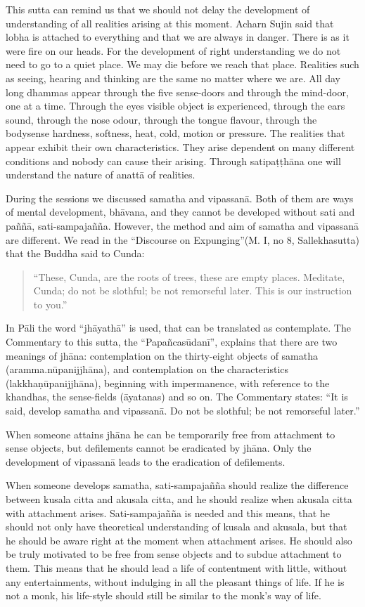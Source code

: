 This sutta can remind us that we should not delay the development of understanding of all realities arising at this moment. Acharn Sujin said that lobha is attached to everything and that we are always in danger. There is as it were fire on our heads.
For the development of right understanding we do not need to go to a quiet place. We may die before we reach that place. Realities such as seeing, hearing and thinking are the same no matter where we are. All day long dhammas appear through the five sense-doors and through the mind-door, one at a time. Through the eyes visible object is experienced, through the ears sound, through the nose odour, through the tongue flavour, through the bodysense hardness, softness, heat, cold, motion or pressure. The realities that appear exhibit their own characteristics. They arise dependent on many different conditions and nobody can cause their arising. Through satipaṭṭhāna one will understand the nature of anattā of realities.

During the sessions we discussed samatha and vipassanā. Both of them are ways of mental development, bhāvana, and they cannot be developed without sati and paññā, sati-sampajañña. However, the method and aim of samatha and vipassanā are different.
We read in the ``Discourse on Expunging''(M. I, no 8, Sallekhasutta) that the Buddha said to Cunda:

\begin{quote}
``These, Cunda, are the roots of trees, these are empty places. Meditate, Cunda; do not be slothful; be not remorseful later. This is our instruction to you.''
\end{quote}

In Pāli the word ``jhāyathā'' is used, that can be translated as contemplate. The Commentary to this sutta, the ``Papañcasūdanī'', explains that there are two meanings of jhāna:
contemplation on the thirty-eight objects of samatha (aramma.nūpanijjhāna), and contemplation on the characteristics (lakkhaṇūpanijjhāna), beginning with impermanence, with reference to the khandhas, the sense-fields (āyatanas) and so on. The Commentary states: ``It is said, develop samatha and vipassanā. Do not be slothful; be not remorseful later.''

When someone attains jhāna he can be temporarily free from attachment to sense objects, but defilements cannot be eradicated by jhāna. Only the development of vipassanā leads to the eradication of defilements.

When someone develops samatha, sati-sampajañña should realize the difference between kusala citta and akusala citta, and he should realize when akusala citta with attachment arises. Sati-sampajañña is needed and this means, that he should not only have theoretical understanding of kusala and akusala, but that he should be aware right at the moment when attachment arises. He should also be truly motivated to be free from sense objects and to subdue attachment to them. This means that he should lead a life of contentment with little, without any entertainments, without indulging in all the pleasant things of life. If he is not a monk, his life-style should still be similar to the monk’s way of life.

